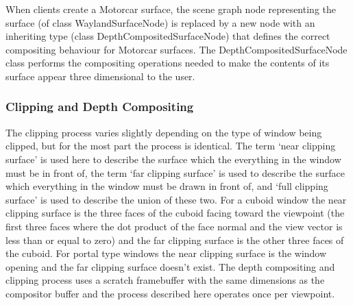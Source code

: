 When clients create a Motorcar surface, the scene graph node representing the surface (of class WaylandSurfaceNode) is replaced by a new node with an inheriting type (class DepthCompositedSurfaceNode)  that defines the correct compositing behaviour for Motorcar surfaces. The DepthCompositedSurfaceNode class performs the compositing operations needed to make the contents of its surface appear three dimensional to the user.

\subsubsection{Clipping and Depth Compositing}
\label{sec:clipping-impl}

The clipping process varies slightly depending on the type of window being clipped, but for the most part the process is identical. The term `near clipping surface' is used here to describe the surface which the everything in the window must be in front of, the term `far clipping surface' is used to describe the surface which everything in the window must be drawn in front of, and `full clipping surface' is used to describe the union of these two. For a cuboid window the near clipping surface is the three faces of the cuboid facing toward the viewpoint (the first three faces where the dot product of the face normal and the view vector is less than or equal to zero) and the far clipping surface is the other three faces of the cuboid. For portal type windows the near clipping surface is the window opening and the far clipping surface doesn't exist. The depth compositing and clipping process uses a scratch framebuffer with the same dimensions as the compositor buffer and the process described here operates once per viewpoint.

